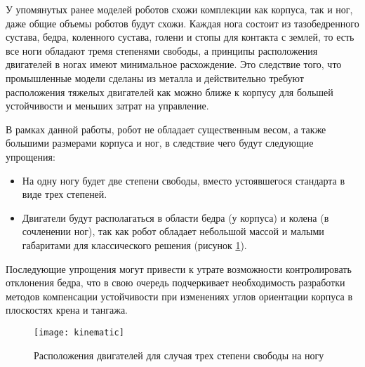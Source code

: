 У упомянутых ранее моделей роботов схожи комплекции как корпуса, так и ног, даже общие объемы роботов будут схожи. 
Каждая нога состоит из тазобедренного сустава, бедра, коленного сустава, голени и стопы для контакта с землей, то есть все ноги обладают тремя степенями свободы, а принципы расположения двигателей в ногах имеют минимальное расхождение. Это следствие того, что промышленные модели сделаны из металла и действительно требуют расположения тяжелых двигателей как можно ближе к корпусу для большей устойчивости и меньших затрат на управление. 

В рамках данной работы, робот не обладает существенным весом, а также большими размерами корпуса и ног, в следствие чего будут следующие упрощения:
\begin{itemize}
	\item На одну ногу будет две степени свободы, вместо устоявшегося стандарта в виде трех степеней.
	\item Двигатели будут располагаться в области бедра (у корпуса) и колена (в сочленении ног), так как робот обладает небольшой массой и малыми габаритами для классического решения (рисунок \ref{kinematic}).
\end{itemize}


Последующие упрощения могут привести к утрате возможности контролировать отклонения бедра, что в свою очередь подчеркивает необходимость разработки методов компенсации устойчивости при изменениях углов ориентации корпуса в плоскостях крена и тангажа.
\newpage
\begin{figure}[h]
	\begin{center}
		\texttt{[image: kinematic]}
		\caption{Расположения двигателей для случая трех степени свободы на ногу}
		\label{kinematic}
	\end{center}
\end{figure}
